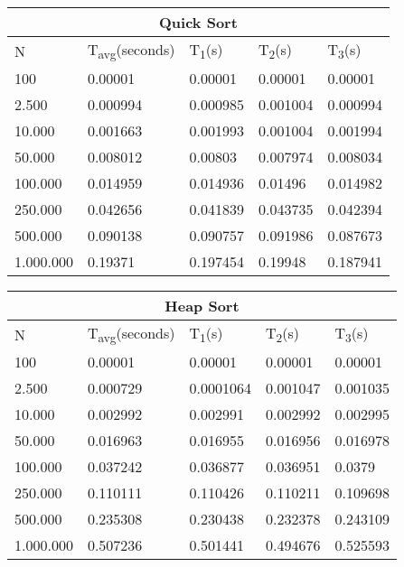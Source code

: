 \documentclass[]{article}
\begin{document}
\iffalse
	QUICK SORT
\fi

\begin{table}[H]
	\centering
\begin{tabular}{|l|l|l|l|l|}
\hline
\multicolumn{5}{|c|}{Quick Sort} \\ \hline
N & T\textsubscript{avg}(seconds) & T\textsubscript{1}(s) & T\textsubscript{2}(s) & T\textsubscript{3}(s) \\ \hline
100 & 0.00001 & 0.00001 & 0.00001 & 0.00001 \\ \hline
2.500 & 0.000994 & 0.000985 & 0.001004 & 0.000994 \\ \hline
10.000 & 0.001663 & 0.001993 & 0.001004 & 0.001994 \\ \hline
50.000 & 0.008012 & 0.00803 & 0.007974 & 0.008034 \\ \hline
100.000 & 0.014959 & 0.014936 & 0.01496 & 0.014982 \\ \hline
250.000 & 0.042656 & 0.041839 & 0.043735 & 0.042394 \\ \hline
500.000 & 0.090138 & 0.090757 & 0.091986 & 0.087673 \\ \hline
1.000.000 & 0.19371 & 0.197454 & 0.19948 & 0.187941 \\ \hline
\end{tabular}
\end{table}

\iffalse
	HEAP SORT
\fi


\begin{table}[H]
	\centering
\begin{tabular}{|l|l|l|l|l|}
\hline
\multicolumn{5}{|c|}{Heap Sort} \\ \hline
N & T\textsubscript{avg}(seconds) & T\textsubscript{1}(s) & T\textsubscript{2}(s) & T\textsubscript{3}(s) \\ \hline
100 & 0.00001 & 0.00001 & 0.00001 & 0.00001 \\ \hline
2.500 & 0.000729 & 0.0001064 & 0.001047 & 0.001035 \\ \hline
10.000 & 0.002992 & 0.002991 & 0.002992 & 0.002995 \\ \hline
50.000 & 0.016963 & 0.016955 & 0.016956 & 0.016978 \\ \hline
100.000 & 0.037242 & 0.036877 & 0.036951 & 0.0379 \\ \hline
250.000 & 0.110111 & 0.110426 & 0.110211 & 0.109698 \\ \hline
500.000 & 0.235308 & 0.230438 & 0.232378 & 0.243109 \\ \hline
1.000.000 & 0.507236 & 0.501441 & 0.494676 & 0.525593 \\ \hline
\end{tabular}
\end{table}
\end{document}
